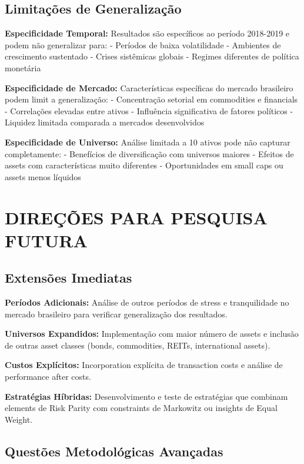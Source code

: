 \subsection{Limitações de Generalização}

\textbf{Especificidade Temporal:} Resultados são específicos ao período 2018-2019 e podem não generalizar para:
- Períodos de baixa volatilidade
- Ambientes de crescimento sustentado
- Crises sistêmicas globais
- Regimes diferentes de política monetária

\textbf{Especificidade de Mercado:} Características específicas do mercado brasileiro podem limit a generalização:
- Concentração setorial em commodities e financials
- Correlações elevadas entre ativos
- Influência significativa de fatores políticos
- Liquidez limitada comparada a mercados desenvolvidos

\textbf{Especificidade de Universo:} Análise limitada a 10 ativos pode não capturar completamente:
- Benefícios de diversificação com universos maiores
- Efeitos de assets com características muito diferentes
- Oportunidades em small caps ou assets menos líquidos

\section{DIREÇÕES PARA PESQUISA FUTURA}

\subsection{Extensões Imediatas}

\textbf{Períodos Adicionais:} Análise de outros períodos de stress e tranquilidade no mercado brasileiro para verificar generalização dos resultados.

\textbf{Universos Expandidos:} Implementação com maior número de assets e inclusão de outras asset classes (bonds, commodities, REITs, international assets).

\textbf{Custos Explícitos:} Incorporation explícita de transaction costs e análise de performance after costs.

\textbf{Estratégias Híbridas:} Desenvolvimento e teste de estratégias que combinam elements de Risk Parity com constraints de Markowitz ou insights de Equal Weight.

\subsection{Questões Metodológicas Avançadas}

